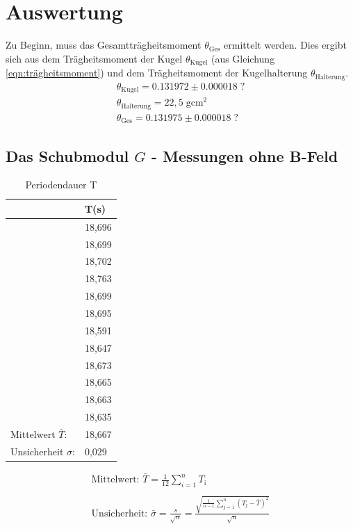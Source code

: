 
\newpage
\section{Auswertung}
Zu Beginn, muss das Gesamtträgheitsmoment $\theta_\text{Ges}$ ermittelt werden.
Dies ergibt sich aus dem Trägheitsmoment der Kugel $\theta_\text{Kugel}$ (aus Gleichung \ref{eqn:trägheitsmoment}) und
dem Trägheitsmoment der Kugelhalterung $\theta_\text{Halterung}$.
\begin{gather}
    \theta_\text{Kugel}=0.131972 \pm 0.000018\;\mathrm{?}\\
    \theta_\text{Halterung}=22,5 \;\mathrm{gcm^2}\\ %
    \theta_\text{Ges}=0.131975 \pm 0.000018 \;\mathrm{?}
\end{gather}

\subsection{Das Schubmodul $G$ - Messungen ohne B-Feld}
\begin{table}
    \centering
    \label{tab:tabelle_1}
    \begin{tabular}{p{3cm} | p{2cm}}
    \toprule
    & T(s) \\
    \midrule
    &18,696\\
    &18,699\\
    &18,702\\
    &18,763\\
    &18,699\\
    &18,695\\
    &18,591\\
    &18,647\\
    &18,673\\
    &18,665\\
    &18,663\\
    &18,635\\
    \midrule
    Mittelwert $\bar{T}$:     & 18,667 \\
    Unsicherheit $\sigma$:  & 0,029 \\
    \bottomrule
    \end{tabular}
    \caption{Periodendauer T}
\end{table}
\begin{gather*}
    \textrm{Mittelwert: } \bar{T}=\frac{1}{12}\sum_{i=1}^{n}T_\text{i}\\\\
    \textrm{Unsicherheit: } \bar{\sigma}=\frac{s}{\sqrt{n}}=\frac{\sqrt{\frac{1}{n-1}\sum_{j=1}^n(T_\text{j}-\bar{T})^2}}{\sqrt{n}}
\end{gather*}


